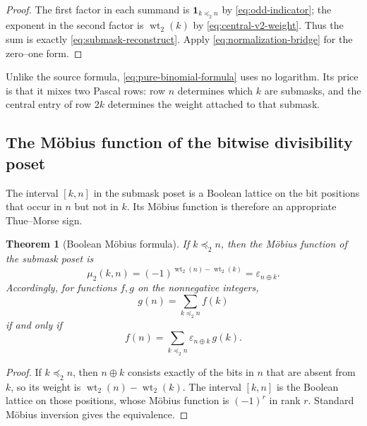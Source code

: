 \documentclass[11pt,oneside]{article}
\newtheorem{theorem}{Theorem}[section]
\theoremstyle{definition}
\theoremstyle{remark}
\newcommand{\wt}{\operatorname{wt}_2}
\newcommand{\ind}{\mathbf 1}
\newcommand{\xor}{\mathbin{\oplus}}
\newcommand{\preceqbits}{\mathrel{\preccurlyeq_2}}
\begin{document}
\begin{proof}
The first factor in each summand is $\ind_{k\preceqbits n}$ by
\eqref{eq:odd-indicator}; the exponent in the second factor is $\wt(k)$ by
\eqref{eq:central-v2-weight}.  Thus the sum is exactly
\eqref{eq:submask-reconstruct}.  Apply \eqref{eq:normalization-bridge} for the
zero--one form.
\end{proof}

Unlike the source formula, \eqref{eq:pure-binomial-formula} uses no logarithm.
Its price is that it mixes two Pascal rows: row $n$ determines which $k$ are
submasks, and the central entry of row $2k$ determines the weight attached to
that submask.

\subsection{The Möbius function of the bitwise divisibility poset}

The interval $[k,n]$ in the submask poset is a Boolean lattice on the bit
positions that occur in $n$ but not in $k$.  Its Möbius function is therefore
an appropriate Thue--Morse sign.

\begin{theorem}[Boolean Möbius formula]
\label{thm:boolean-mobius}
If $k\preceqbits n$, then the Möbius function of the submask poset is
\begin{equation}
  \mu_2(k,n)=(-1)^{\wt(n)-\wt(k)}
             =\varepsilon_{n\xor k}.                       \label{eq:boolean-mobius}
\end{equation}
Accordingly, for functions $f,g$ on the nonnegative integers,
\begin{equation}
  g(n)=\sum_{k\preceqbits n}f(k)                            \label{eq:boolean-zeta}
\end{equation}
if and only if
\begin{equation}
  \boxed{\displaystyle
  f(n)=\sum_{k\preceqbits n}
        \varepsilon_{n\xor k}\,g(k).}                      \label{eq:boolean-mobius-inversion}
\end{equation}
\end{theorem}

\begin{proof}
If $k\preceqbits n$, then $n\xor k$ consists exactly of the bits in $n$ that are
absent from $k$, so its weight is $\wt(n)-\wt(k)$.  The interval $[k,n]$ is the
Boolean lattice on those positions, whose Möbius function is $(-1)^r$ in rank
$r$.  Standard Möbius inversion gives the equivalence.
\end{proof}
\end{document}
